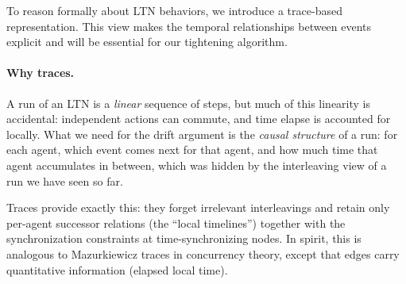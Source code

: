 To reason formally about LTN behaviors, we introduce a trace-based representation. This view makes the temporal relationships between events explicit and will be essential for our tightening algorithm.

\paragraph*{Why traces.}
A run of an LTN is a \emph{linear} sequence of steps, but much of this linearity is accidental: independent actions can commute, and time elapse is accounted for locally. What we need for the drift argument is the \emph{causal structure} of a run: for each agent, which event comes next for that agent, and how much time that agent accumulates in between, which was hidden by the interleaving view of a run we have seen so far.

Traces provide exactly this: they forget irrelevant interleavings and retain only per-agent successor relations (the ``local timelines'') together with the synchronization constraints at time-synchronizing nodes. In spirit, this is analogous to Mazurkiewicz traces in concurrency theory, except that edges carry quantitative information (elapsed local time).


